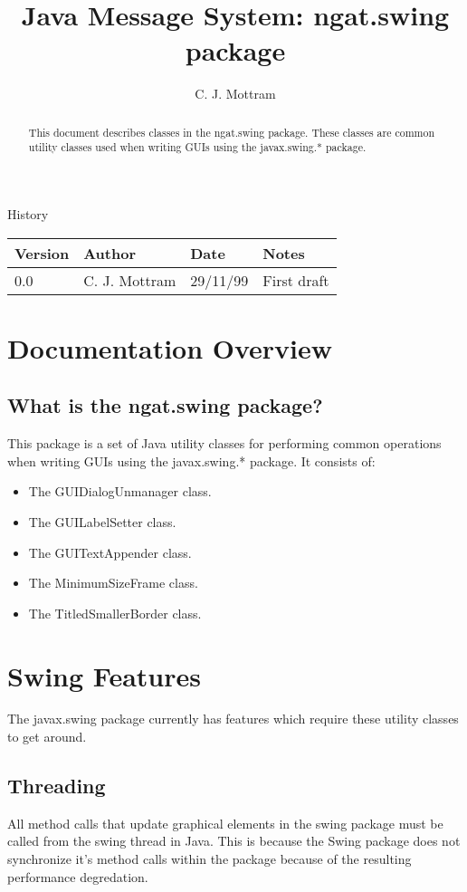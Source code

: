 \documentclass[10pt,a4paper]{article}
\title{Java Message System: ngat.swing package}
\author{C. J. Mottram}
\date{}
\begin{document}
\thispagestyle{empty}
\maketitle
\begin{abstract}
This document describes classes in the ngat.swing package.
These classes are common utility classes used when writing GUIs using the javax.swing.* package.
\end{abstract}

\centerline{\Large History}
\begin{center}
\begin{tabular}{|l|l|l|p{15em}|}
\hline
{\bf Version} & {\bf Author} & {\bf Date} & {\bf Notes} \\
\hline
0.0 &              C. J. Mottram & 29/11/99 & First draft \\
\hline
\end{tabular}
\end{center}

\newpage
\tableofcontents
\listoffigures
\listoftables
\newpage

\section{Documentation Overview}
\subsection{What is the ngat.swing package?}
This package is a set of Java utility classes for performing common operations
when writing GUIs using the javax.swing.* package.
It consists of:
\begin{itemize}
\item The GUIDialogUnmanager class.
\item The GUILabelSetter class.
\item The GUITextAppender class.
\item The MinimumSizeFrame class.
\item The TitledSmallerBorder class.
\end{itemize}


\section{Swing Features}
The javax.swing package currently has features which require these utility classes to get around.

\subsection{Threading}
All method calls that update graphical elements in the swing package must be called from the swing thread in Java.
This is because the Swing package does not synchronize it's method calls within the package because of
the resulting performance degredation.
\end{document}

